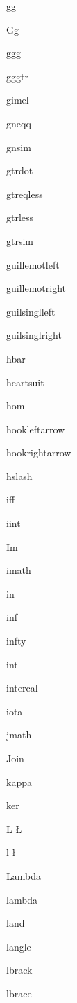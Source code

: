 \documentclass{article}
\begin{document}
gg    \gg{}

Gg    \Gg{}

ggg    \ggg{}

gggtr    \gggtr{}

gimel    \gimel{}

gneqq    \gneqq{}

gnsim    \gnsim{}

gtrdot    \gtrdot{}

gtreqless    \gtreqless{}

gtrless    \gtrless{}

gtrsim    \gtrsim{}

guillemotleft    \guillemotleft{}

guillemotright    \guillemotright{}

guilsinglleft    \guilsinglleft{}

guilsinglright    \guilsinglright{}


hbar    \hbar{}

heartsuit    \heartsuit{}

hom    \hom{}

hookleftarrow    \hookleftarrow{}

hookrightarrow    \hookrightarrow{}

hslash    \hslash{}


iff    \iff{}

iint    \iint{}

Im    \Im{}

imath    \imath{}

in    \in{}

inf    \inf{}

infty    \infty{}

int    \int{}

intercal    \intercal{}

iota    \iota{}


jmath    \jmath{}

Join    \Join{}


kappa    \kappa{}

ker    \ker{}


L    \L{}

l    \l{}

Lambda    \Lambda{}

lambda    \lambda{}

land    \land{}

langle    \langle{}

lbrack    \lbrack{}

lbrace    \lbrace{}
\end{document}
